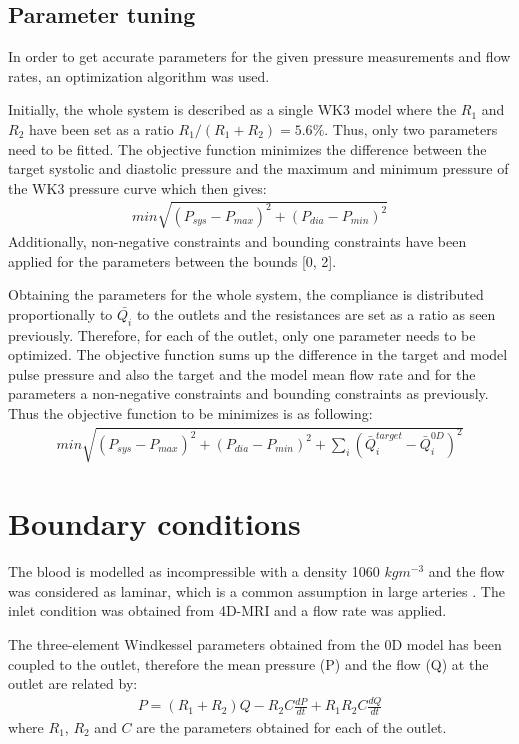 \subsection{Parameter tuning}
In order to get accurate parameters for the given pressure measurements and flow rates, an optimization algorithm was used. \par

Initially, the whole system is described as a single WK3 model where the $R_1$ and $R_2$ have been set as a ratio $R_1/(R_1+R_2) = 5.6\%$. Thus, only two parameters need to be fitted. The objective function minimizes the difference between the target systolic and diastolic pressure and the maximum and minimum pressure of the WK3 pressure curve which then gives:
\begin{align}
    min \sqrt{(P_{sys}-P_{max})^2+(P_{dia}-P_{min})^2}
\end{align}
 Additionally, non-negative constraints and bounding constraints have been applied for the parameters between the bounds [0, 2]. \par

Obtaining the parameters for the whole system, the compliance is distributed proportionally to $\bar{Q_i}$ to the outlets and the resistances are set as a ratio as seen previously. Therefore, for each of the outlet, only one parameter needs to be optimized. The objective function sums up the difference in the target and model pulse pressure and also the target and the model mean flow rate and for the parameters a non-negative constraints and bounding constraints as previously. Thus the objective function to be minimizes is as following:
\begin{align}
    min \sqrt{(P_{sys}-P_{max})^2+(P_{dia}-P_{min})^2+\sum_{i}(\bar{Q}_{i}^{target}-\bar{Q}_{i}^{0D})^2}
\end{align}


\section{Boundary conditions}
The blood is modelled as incompressible with a density 1060 $kg m^{-3}$ and the flow was considered as laminar, which is a common assumption in large arteries \cite{Alimohammadi2014DevelopmentConditions,Bonfanti2017ComputationalData}. The inlet condition was obtained from 4D-MRI and a flow rate was applied.\par

The three-element Windkessel parameters obtained from the 0D model has been coupled to the outlet, therefore the mean pressure (P) and the flow (Q) at the outlet are related by:
\begin{align}
    P=(R_1+R_2)Q-R_2C\frac{dP}{dt}+R_1R_2C\frac{dQ}{dt}
\end{align}
where $R_1$, $R_2$ and $C$ are the parameters obtained for each of the outlet. \par

